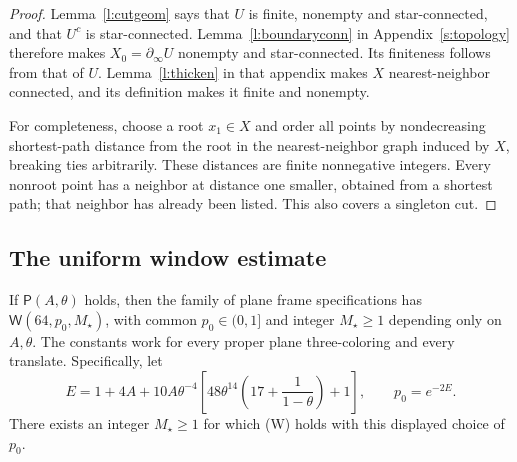 \begin{proof}
Lemma~\ref{l:cutgeom} says that \(U\) is finite, nonempty and
star-connected, and that \(U^c\) is star-connected.
Lemma~\ref{l:boundaryconn} in Appendix~\ref{s:topology} therefore makes
\(X_0=\partial_\infty U\) nonempty and star-connected.
Its finiteness follows from that of \(U\).
Lemma~\ref{l:thicken} in that appendix makes \(X\) nearest-neighbor connected,
and its definition makes it finite and nonempty.

For completeness, choose a root \(x_1\in X\) and order all
points by nondecreasing shortest-path distance from the root
in the nearest-neighbor graph induced by \(X\), breaking
ties arbitrarily.  These distances are finite nonnegative
integers.  Every nonroot point has a neighbor at distance
one smaller, obtained from a shortest path; that neighbor
has already been listed.  This also covers a singleton cut.
\end{proof}

\subsection{The uniform window estimate}

\begin{theorem}\label{t:cutMOS}
If \(\mathsf P(A,\theta)\) holds, then the family of plane frame
specifications has \(\mathsf W(64,p_0,M_\star)\), with common
\(p_0\in(0,1]\) and integer \(M_\star\ge1\) depending only on
\(A,\theta\). The constants work for every proper plane
three-coloring and every translate.
Specifically, let
\[
 E=1+4A+10A\theta^{-4}
       \left[48\theta^{14}\left(17+\frac1{1-\theta}\right)+1\right],
 \qquad p_0=e^{-2E}.
\]
There exists an integer \(M_\star\ge1\) for which (W) holds
with this displayed choice of \(p_0\).
\end{theorem}

